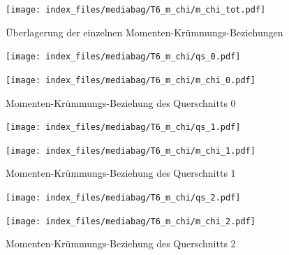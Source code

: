 \documentclass[
  11pt,
  letterpaper,
]{scrreprt}
\begin{document}
\begin{figure}[H]

{\centering \texttt{[image: index\_files/mediabag/T6\_m\_chi/m\_chi\_tot.pdf]}

}

\caption{Überlagerung der einzelnen Momenten-Krümmungs-Beziehungen}

\end{figure}%

\begin{figure}[H]

\begin{minipage}{0.50\linewidth}
\texttt{[image: index\_files/mediabag/T6\_m\_chi/qs\_0.pdf]}\end{minipage}%
%
\begin{minipage}{0.50\linewidth}
\texttt{[image: index\_files/mediabag/T6\_m\_chi/m\_chi\_0.pdf]}\end{minipage}%

\caption{\label{fig-m_chi_appendix}Momenten-Krümmungs-Beziehung des
Querschnitts 0}

\end{figure}%

\begin{figure}[H]

\begin{minipage}{0.50\linewidth}
\texttt{[image: index\_files/mediabag/T6\_m\_chi/qs\_1.pdf]}\end{minipage}%
%
\begin{minipage}{0.50\linewidth}
\texttt{[image: index\_files/mediabag/T6\_m\_chi/m\_chi\_1.pdf]}\end{minipage}%

\caption{\label{fig-m_chi_appendix}Momenten-Krümmungs-Beziehung des
Querschnitts 1}

\end{figure}%

\begin{figure}[H]

\begin{minipage}{0.50\linewidth}
\texttt{[image: index\_files/mediabag/T6\_m\_chi/qs\_2.pdf]}\end{minipage}%
%
\begin{minipage}{0.50\linewidth}
\texttt{[image: index\_files/mediabag/T6\_m\_chi/m\_chi\_2.pdf]}\end{minipage}%

\caption{\label{fig-m_chi_appendix}Momenten-Krümmungs-Beziehung des
Querschnitts 2}

\end{figure}%
\end{document}
